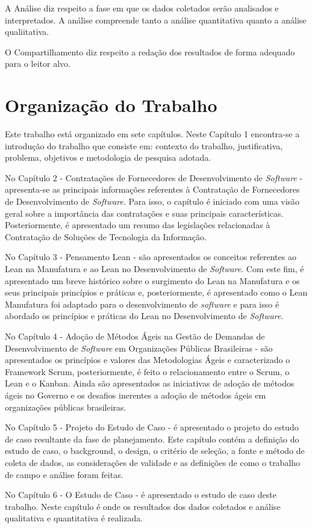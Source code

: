 A Análise diz respeito a fase em que os dados coletados serão analisados e interpretados. A análise compreende tanto a análise quantitativa quanto a análise qualiitativa.

O Compartilhamento diz respeito a redação dos resultados de forma adequado para o leitor alvo.

\section[Organização do Trabalho]{Organização do Trabalho}

Este trabalho está organizado em sete capítulos. Neste Capítulo 1 encontra-se a introdução do trabalho que consiste em: contexto do trabalho,  justificativa,  problema, objetivos e metodologia de pesquisa adotada.

No Capítulo 2 - Contratações de Fornecedores de Desenvolvimento de \textit{Software} - apresenta-se as principais informações referentes à Contratação de Fornecedores de Desenvolvimento de \textit{Software}. Para isso, o capítulo é iniciado com uma visão geral sobre a importância das contratações e suas principais características. Posteriormente, é apresentado um resumo das legislações relacionadas à Contratação de Soluções de Tecnologia da Informação.

No Capítulo 3 - Pensamento Lean - são apresentados os conceitos referentes ao Lean na Manufatura e ao Lean no Desenvolvimento de \textit{Software}. Com este fim, é apresentado um breve histórico sobre o surgimento do Lean na Manufatura e os seus principais princípios e práticas e, posteriormente, é apresentado como o Lean Manufatura foi adaptado para o desenvolvimento de \textit{software} e para isso é abordado os princípios e práticas do Lean no Desenvolvimento de \textit{Software}.

No Capítulo 4  - Adoção de Métodos Ágeis na Gestão de Demandas de Desenvolvimento de \textit{Software} em Organizações Públicas Brasileiras - são apresentados os princípios e valores das Metodologias Ágeis e caracterizado o Framework Scrum, posteriormente, é feito o relacionamento entre o Scrum, o Lean e o Kanban. Ainda são apresentados as iniciativas de adoção de métodos ágeis no Governo e os desafios inerentes a adoção de métodos ágeis em organizações públicas brasileiras.

No Capítulo 5 - Projeto do Estudo de Caso - é apresentado o projeto do estudo de caso resultante da fase de planejamento. Este capítulo contém a definição do estudo de caso, o background, o design, o critério de seleção, a fonte e método de coleta de dados, as considerações de validade e as definições de como o trabalho de campo e análise foram feitas.

No Capítulo 6 -  O Estudo de Caso - é apresentado o estudo de caso deste trabalho. Neste capítulo é onde os resultados dos dados coletados e análise qualitativa e quantitativa é realizada. 
